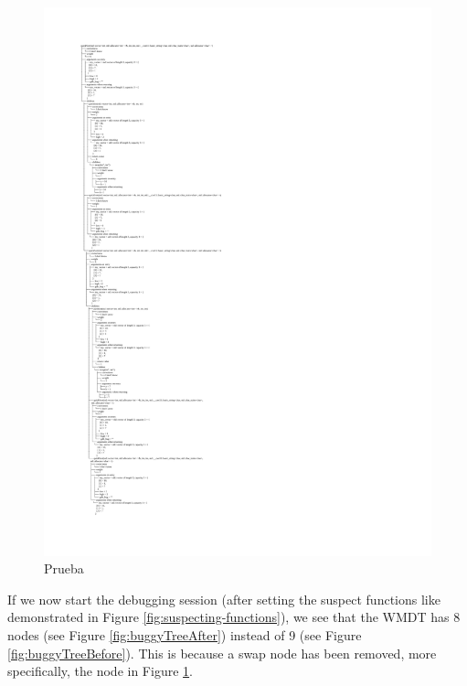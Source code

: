\begin{figure}[p]
\centering
    \caption{Prueba}
    \label{fig:correctNodeRemoved}
\includegraphics[width=\textwidth,height=\textheight,keepaspectratio]{Imagenes/Vectorial/buggy.pdf}
\end{figure}
If we now start the debugging session (after setting the suspect functions like demonstrated in Figure \ref{fig:suspecting-functions}), we see that the WMDT has 8 nodes (see Figure \ref{fig:buggyTreeAfter}) instead of 9 (see Figure \ref{fig:buggyTreeBefore}). This is because a swap node has been removed, more specifically, the node in Figure \ref{fig:correctNodeRemoved}.



